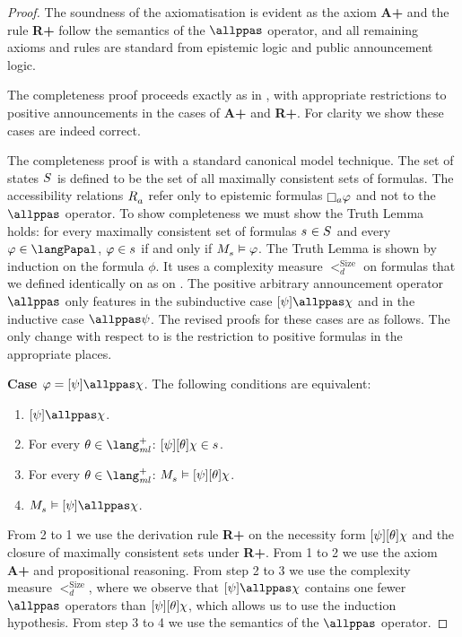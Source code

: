 \begin{proof}
    The soundness of the axiomatisation is evident as the axiom {\bf A+} and the rule {\bf R+} follow the semantics of the $\allppas$ operator, and all remaining axioms and rules are standard from epistemic logic and public announcement logic.

    The completeness proof proceeds exactly as in \cite{balbianietal.short:2014}, with appropriate restrictions to positive announcements in the cases of {\bf A+} and {\bf R+}.
    For clarity we show these cases are indeed correct.
    
    The completeness proof is with a standard canonical model technique.
    The set of states $\kStates$ is defined to be the set of all maximally consistent sets of \langPapal{} formulas.
    The accessibility relations $\kAccessibility{\agentA}$ refer only to epistemic formulas $\knows[\agentA] \phi$ and not to the $\allppas$ operator.
    To show completeness we must show the Truth Lemma holds: for every maximally consistent set of formulas $\kStateS \in \kStates$ and every $\phi \in \langPapal$, $\phi \in \kStateS$ if and only if $\kPModel{\kStateS} \entails \phi$.
    The Truth Lemma is shown by induction on the formula $\phi$.
    It uses a complexity measure $<^\text{Size}_d$ on formulas that we defined identically on \langPapal{} as on \langApal{}.
    The positive arbitrary announcement operator $\allppas$ only features in the subinductive case $\announceA{\psi} \allppas \chi$ and in the inductive case $\allppas \psi$.
    The revised proofs for these cases are as follows.
    The only change with respect to \cite{balbianietal.short:2014} is the restriction to positive formulas in the appropriate places.

    {\bf Case $\phi = \announceA{\psi} \allppas \chi$}.
    The following conditions are equivalent:
    \begin{enumerate}
        \item $\announceA{\psi} \allppas \chi$.
        \item For every $\theta \in \langMlPlus$: $\announceA{\psi} \announceA{\theta} \chi \in \kStateS$.
        \item For every $\theta \in \langMlPlus$: $\kPModel{\kStateS} \entails \announceA{\psi} \announceA{\theta} \chi$.
        \item $\kPModel{\kStateS} \entails \announceA{\psi} \allppas \chi$.
    \end{enumerate}
    From 2 to 1 we use the derivation rule {\bf R+} on the necessity form $[ \psi ] [ \theta ] \chi$ and the closure of maximally consistent sets under {\bf R+}. 
    From 1 to 2 we use the axiom {\bf A+} and propositional reasoning. 
    From step 2 to 3 we use the complexity measure $<^\text{Size}_d$, where we observe that $\announceA{\psi} \allppas \chi$ contains one fewer $\allppas$ operators than $[ \psi ] [ \theta ] \chi$, which allows us to use the induction hypothesis. 
    From step 3 to 4 we use the semantics of the $\allppas$ operator.


\end{proof}
